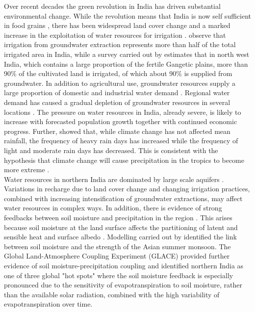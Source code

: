\documentclass{icldt}\usepackage[]{graphicx}\usepackage[]{color}
\begin{document}
Over recent decades the green revolution in India has driven substantial environmental change. While the revolution means that India is now self sufficient in food grains \citep{Singh2000}, there has been widespread land cover change and a marked increase in the exploitation of water resources for irrigation \citep{Roy2007}. \citet{Scott2009} observe that irrigation from groundwater extraction represents more than half of the total irrigated area in India, while a survey carried out by \citet{Shah2006} estimates that in north west India, which contains a large proportion of the fertile Gangetic plains, more than 90\% of the cultivated land is irrigated, of which about 90\% is supplied from groundwater. In addition to agricultural use, groundwater resources supply a large proportion of domestic and industrial water demand \citep{Amarasinghe2005}. Regional water demand has caused a gradual depletion of groundwater resources in several locations \citep{Rodell2009}. The pressure on water resources in India, already severe, is likely to increase with forecasted population growth together with continued economic progress. Further, \citet{Goswami2006} showed that, while climate change has not affected mean rainfall, the frequency of heavy rain days has increased while the frequency of light and moderate rain days has decreased. This is consistent with the hypothesis that climate change will cause precipitation in the tropics to become more extreme \citep{Trenberth2003}. \\

Water resources in northern India are dominated by large scale aquifers \citep{Bandy1995}. Variations in recharge due to land cover change and changing irrigation practices, combined with increasing intensification of groundwater extractions, may affect water resources in complex ways. In addition, there is evidence of strong feedbacks between soil moisture and precipitation in the region \citep[e.g.][]{Meehl1994,Koster2004,Niyogi2010}. This arises because soil moisture at the land surface affects the partitioning of latent and sensible heat and surface albedo \citet{Eltahir1998}. Modelling carried out by \citet{Meehl1994} identified the link between soil moisture and the strength of the Asian summer monsoon. The Global Land-Atmosphere Coupling Experiment (GLACE) \citep{Koster2004,Koster2006,Guo2006} provided further evidence of soil moisture-precipitation coupling and identified northern India as one of three global "hot spots" where the soil moisture feedback is especially pronounced due to the sensitivity of evapotranspiration to soil moisture, rather than the available solar radiation, combined with the high variability of evapotranspiration over time. \\
\end{document}
